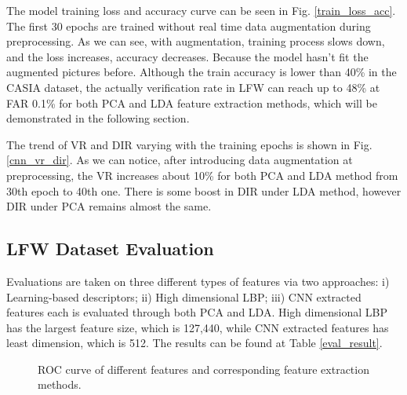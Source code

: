 \documentclass[conference]{IEEEtran}
\begin{document}
The model training loss and accuracy curve can be seen in Fig. \ref{train_loss_acc}. The first 30 epochs are trained without real time data augmentation during preprocessing. As we can see, with augmentation, training process slows down, and the loss increases, accuracy decreases. Because the model hasn't fit the augmented pictures before. Although the train accuracy is lower than 40\% in the CASIA dataset, the actually verification rate in LFW can reach up to 48\% at FAR 0.1\% for both PCA and LDA feature extraction methods, which will be demonstrated in the following section. 

The trend of VR and DIR varying with the training epochs is shown in Fig. \ref{cnn_vr_dir}. As we can notice, after introducing data augmentation at preprocessing, the VR increases about 10\% for both PCA and LDA method from 30th epoch to 40th one. There is some boost in DIR under LDA method, however DIR under PCA remains almost the same. 

\subsection{LFW Dataset Evaluation}

Evaluations are taken on three different types of features via two approaches: i) Learning-based descriptors; ii) High dimensional LBP; iii) CNN extracted features each is evaluated through both PCA and LDA. High dimensional LBP has the largest feature size, which is 127,440, while CNN extracted features has least dimension, which is 512. The results can be found at Table \ref{eval_result}. 

\begin{figure*}
	\centering 
	\hspace{0.25in} 
	\hspace{0.25in} 
	\caption{ROC curve of different features and corresponding feature extraction methods.}
	\label{test_result} %
\end{figure*}
\end{document}
